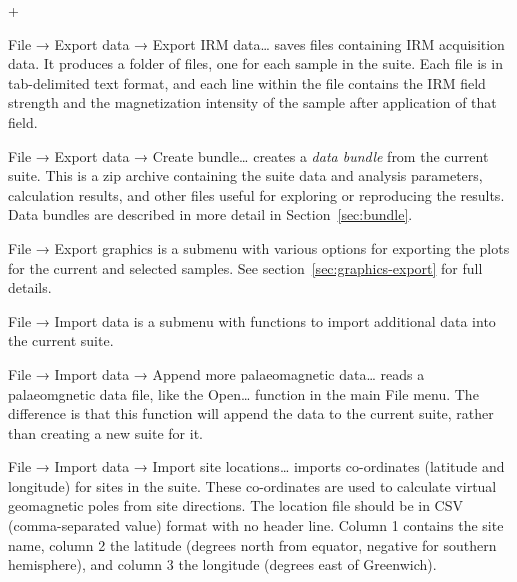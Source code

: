 \documentclass[a4paper,british]{article}
\newcommand{\menuitemlabel}[1]{%
\mbox{\textsf{#1}}\hfil}
\newenvironment{menuitemlist}%
{\begin{list}{}{%
\renewcommand{\makelabel}{\menuitemlabel}%
\setlength{\labelwidth}{35pt}%
\setlength{\leftmargin}%
             {\labelwidth+\labelsep}}}%
{\end{list}}
\newcommand{\ppcmd}[1]{\textsf{#1}} %
\newcommand{\caps}[1]{\MakeTextUppercase{#1}} %
\newcommand{\submenu}{ \textrm{→} }
\begin{document}
\begin{menuitemlist}
\item[File\submenu Export data\submenu Export IRM data\ldots] saves files
  containing \caps{irm} acquisition data. It produces a folder of files, one
  for each sample in the suite. Each file is in tab-delimited text format,
  and each line within the file contains the \caps{irm} field strength and
  the magnetization intensity of the sample after application of that field.

\item[File\submenu Export data\submenu Create bundle\ldots] creates a
  \emph{data bundle} from the current suite. This is a zip archive
  containing the suite data and analysis parameters, calculation
  results, and other files useful for exploring or reproducing the
  results. Data bundles are described in more detail in
  Section~\ref{sec:bundle}.

\item[File\submenu Export graphics] is a submenu with various options
  for exporting the plots for the current and selected samples.
  See section~\ref{sec:graphics-export} for full details.

\item[File\submenu Import data] is a submenu with functions to import
  additional data into the current suite.

\item[File\submenu Import data\submenu Append more palaeomagnetic data\ldots]
  reads a palaeomgnetic data file, like the \ppcmd{Open\ldots} function
  in the main \ppcmd{File} menu. The difference is that this function
  will append the data to the current suite, rather than creating a 
  new suite for it.

\item[File\submenu Import data\submenu Import site locations\ldots]
  imports co-ordinates (latitude and longitude) for sites in the suite.
  These co-ordinates are used to calculate virtual geomagnetic poles
  from site directions. The location file should be in \caps{csv}
  (comma-separated value) format with no header line. Column 1 contains
  the site name, column 2 the latitude (degrees north from equator,
  negative for southern hemisphere), and column 3 the longitude (degrees
  east of Greenwich).


\end{menuitemlist}
\end{document}
